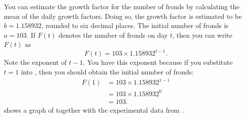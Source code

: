 \documentclass[a4paper,oneside,12pt]{article}
\begin{document}
\begin{problem}
{\begin{solution}
\begin{table}[!htbp]
\centering

\caption{%
  The experimental number of fronds in a colony of duckweeds, counted
  each day for nine consecutive days.  Before the first day, the
  colony had been exposed to $12$ hours of light per day for three
  consecutive days.  This is the same as
   except that missing entries
  have been filled in.  All numbers in the column for daily growth
  factor have been rounded to six decimal places.
}
\label{tab:duckweed_frond12_complete}
\end{table}

You can estimate the growth factor for the number of fronds by
calculating the mean of the daily growth factors.  Doing so, the
growth factor is estimated to be $b = 1.158932$, rounded to six
decimal places.  The initial number of fronds is $a = 103$.  If $F(t)$
denotes the number of fronds on day $t$, then you can write $F(t)$ as
\begin{equation}
\label{eqn:fronds_formula_average_growth_factor}
F(t)
=
103 \times 1.158932^{t - 1}.
\end{equation}
Note the exponent of $t - 1$.  You have this exponent because if you
substitute $t = 1$ into
, then you should
obtain the initial number of fronds:
\begin{align*}
F(1)
&=
103 \times 1.158932^{1 - 1} \\[4pt]
&=
103 \times 1.158932^0 \\[4pt]
&=
103.
\end{align*}
 shows a graph of
 together with the
experimental data from .


\end{solution}}
\end{problem}
\end{document}
